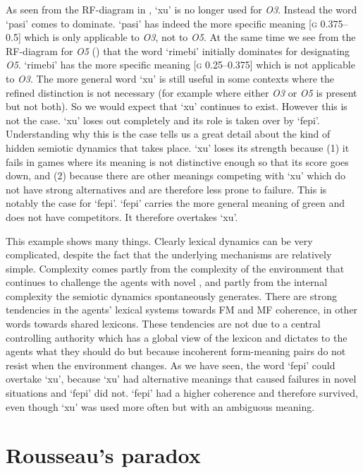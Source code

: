 As seen from the RF-diagram in , `xu' is no
longer used for \emph{O3}. Instead the word `pasi' comes to 
dominate. `pasi' has indeed the more specific 
meaning [\textsc{g} 0.375–0.5] which is only applicable to \emph{O3}, 
not to \emph{O5}. At the same time we see from the RF-diagram 
for \emph{O5} ()
that the word `rimebi' initially dominates for designating \emph{O5}. 
`rimebi' has the more specific meaning [\textsc{g} 0.25–0.375] which 
is not applicable to \emph{O3}. 
The more general word `xu' is still useful in some 
contexts where the
refined distinction is not necessary (for example where 
either \emph{O3} or \emph{O5} is present but not both). So we would expect
that `xu' continues to exist. However this is not the case. `xu'
loses out completely and its role is taken over by `fepi'. 
\clearpage
Understanding why this is the case
tells us a great detail about the kind 
of hidden semiotic dynamics that takes place. `xu' loses its
strength because (1) it fails in games where its meaning
is  not distinctive enough so that its score goes
down, and (2) because there 
are other meanings competing with `xu' which do not 
have strong alternatives and are therefore
less prone to failure. This is notably the case for
`fepi'. `fepi' carries the more general meaning of green
and does not have competitors. It therefore overtakes
`xu'. 

This example shows many things. Clearly
lexical dynamics can be very complicated, despite the 
fact that the underlying mechanisms are relatively 
simple. Complexity comes partly from the complexity of
the environment that continues to challenge the agents
with novel , and partly from the internal 
complexity the semiotic dynamics spontaneously generates. 
There are strong tendencies in the agents' lexical systems
towards FM and MF coherence, 
in other words towards shared lexicons. These tendencies
are not due to a central controlling authority which 
has a global view of the lexicon and dictates to the 
agents what they should do but because incoherent 
form-meaning pairs do not resist when the environment 
changes. As we have seen, the word `fepi' could 
overtake `xu', because `xu' had alternative meanings that 
caused failures in novel situations and `fepi' did not. 
`fepi' had a higher coherence and therefore survived, even
though `xu' was used more often but with an 
ambiguous meaning. 

\section{Rousseau's paradox}

